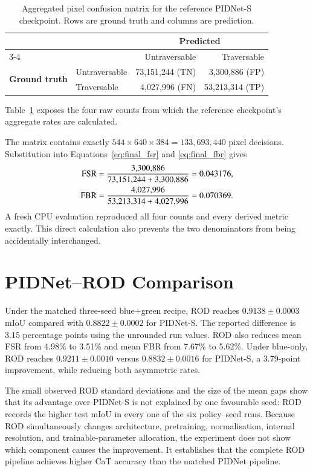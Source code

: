 \begin{table}[H]
\centering
\caption{Aggregated pixel confusion matrix for the reference PIDNet-S checkpoint.
Rows are ground truth and columns are prediction.}
\label{tab:frozen_confusion}
\begin{tabular}{@{}llrr@{}}
\toprule
 & & \multicolumn{2}{c}{\textbf{Predicted}} \\
\cmidrule(lr){3-4}
 & & Untraversable & Traversable \\
\midrule
\multirow{2}{*}{\textbf{Ground truth}}
 & Untraversable & 73,151,244 (TN) & \textcolor{safety}{3,300,886 (FP)} \\
 & Traversable & \textcolor{block}{4,027,996 (FN)} & 53,213,314 (TP) \\
\bottomrule
\end{tabular}
\end{table}

Table~\ref{tab:frozen_confusion} exposes the four raw counts from which the
reference checkpoint's aggregate rates are calculated.

The matrix contains exactly
$544\times640\times384=133{,}693{,}440$ pixel decisions. Substitution into
Equations~\ref{eq:final_fsr} and \ref{eq:final_fbr} gives
\begin{align}
 \mathrm{FSR}&=\frac{3{,}300{,}886}{73{,}151{,}244+3{,}300{,}886}=0.043176,\\
 \mathrm{FBR}&=\frac{4{,}027{,}996}{53{,}213{,}314+4{,}027{,}996}=0.070369.
\end{align}
A fresh CPU evaluation reproduced all four counts and every derived metric
exactly. This direct calculation also prevents the two denominators from being
accidentally interchanged.

\section{PIDNet--ROD Comparison}

Under the matched three-seed blue+green recipe, ROD reaches
$0.9138\pm0.0003$ mIoU compared with $0.8822\pm0.0002$ for PIDNet-S. The
reported difference is 3.15 percentage points using the unrounded run values.
ROD also reduces mean FSR from 4.98\% to 3.51\% and mean FBR from 7.67\% to
5.62\%. Under blue-only, ROD reaches $0.9211\pm0.0010$ versus
$0.8832\pm0.0016$ for PIDNet-S, a 3.79-point improvement, while reducing both
asymmetric rates.

The small observed ROD standard deviations and the size of the mean gaps show
that its advantage over PIDNet-S is not explained by one favourable seed: ROD records
the higher test mIoU in every one of the six policy--seed runs. Because
ROD simultaneously changes architecture, pretraining, normalisation, internal
resolution, and trainable-parameter allocation, the experiment does not show
which component causes the improvement. It establishes that the complete ROD
pipeline achieves higher CaT accuracy than the matched PIDNet pipeline.

